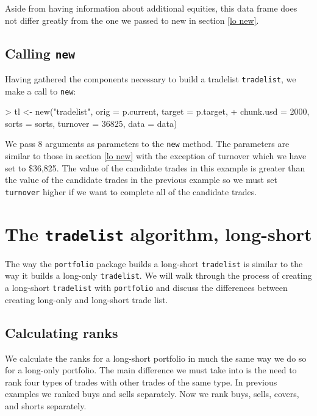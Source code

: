 \documentclass{article}
\begin{document}
Aside from having information about additional equities, this data
frame does not differ greatly from the one we passed to new in section
\ref{lo new}.

\subsection{Calling \texttt{new}}
\label{ls new}

Having gathered the components necessary to build a tradelist
\texttt{tradelist}, we make a call to \texttt{new}:

\begin{Schunk}
\begin{Sinput}
> tl <- new("tradelist", orig = p.current, target = p.target, 
+     chunk.usd = 2000, sorts = sorts, turnover = 36825, data = data)
\end{Sinput}
\end{Schunk}


We pass 8 arguments as parameters to the \texttt{new} method.  The
parameters are similar to those in section \ref{lo new} with the
exception of turnover which we have set to
\$36,825.  The value of the
candidate trades in this example is greater than the value of the
candidate trades in the previous example so we must set
\texttt{turnover} higher if we want to complete all of the candidate
trades.

\section{The \texttt{tradelist} algorithm, long-short}

The way the \texttt{portfolio} package builds a long-short
\texttt{tradelist} is similar to the way it builds a long-only
\texttt{tradelist}.  We will walk through the process
of creating a long-short \texttt{tradelist} with \texttt{portfolio}
and discuss the differences between creating long-only and long-short
trade list.

\subsection{Calculating ranks}
 
We calculate the ranks for a long-short portfolio in much the same way
we do so for a long-only portfolio.  The main difference we must take
into is the need to rank four types of trades with other trades of the
same type.  In previous examples we ranked buys and sells separately.
Now we rank buys, sells, covers, and shorts separately.
\end{document}
